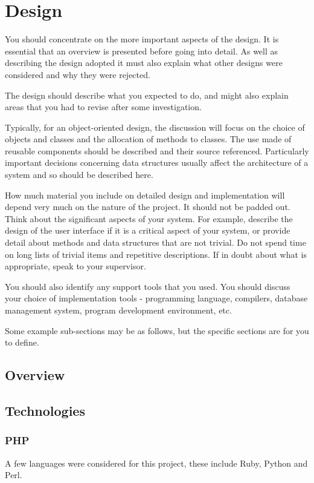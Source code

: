 \chapter{Design}

You should concentrate on the more important aspects of the design. It is essential that an overview is presented before going into detail. As well as describing the design adopted it must also explain what other designs were considered and why they were rejected.

The design should describe what you expected to do, and might also explain areas that you had to revise after some investigation.

Typically, for an object-oriented design, the discussion will focus on the choice of objects and classes and the allocation of methods to classes. The use made of reusable components should be described and their source referenced. Particularly important decisions concerning data structures usually affect the architecture of a system and so should be described here.

How much material you include on detailed design and implementation will depend very much on the nature of the project. It should not be padded out. Think about the significant aspects of your system. For example, describe the design of the user interface if it is a critical aspect of your system, or provide detail about methods and data structures that are not trivial. Do not spend time on long lists of trivial items and repetitive descriptions. If in doubt about what is appropriate, speak to your supervisor.
 
You should also identify any support tools that you used. You should discuss your choice of implementation tools - programming language, compilers, database management system, program development environment, etc.

Some example sub-sections may be as follows, but the specific sections are for you to define. 

\section{Overview}
\section{Technologies}
	\subsection{PHP}
		A few languages were considered for this project, these include Ruby, Python and Perl. 
		
